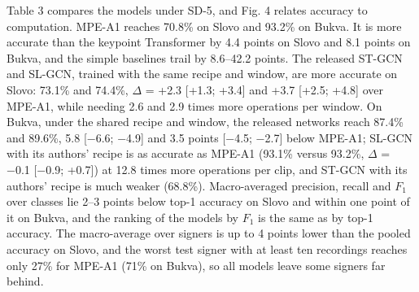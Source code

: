 Table 3 compares the models under SD-5, and Fig. 4 relates accuracy to computation. MPE-A1 reaches 70.8\% on Slovo and 93.2\% on Bukva. It is more accurate than the keypoint Transformer by 4.4 points on Slovo and 8.1 points on Bukva, and the simple baselines trail by 8.6--42.2 points. The released ST-GCN and SL-GCN, trained with the same recipe and window, are more accurate on Slovo: 73.1\% and 74.4\%, \(\Delta\) = +2.3 {[}+1.3; +3.4{]} and +3.7 {[}+2.5; +4.8{]} over MPE-A1, while needing 2.6 and 2.9 times more operations per window. On Bukva, under the shared recipe and window, the released networks reach 87.4\% and 89.6\%, 5.8 {[}−6.6; −4.9{]} and 3.5 points {[}−4.5; −2.7{]} below MPE-A1; SL-GCN with its authors' recipe is as accurate as MPE-A1 (93.1\% versus 93.2\%, \(\Delta\) = −0.1 {[}−0.9; +0.7{]}) at 12.8 times more operations per clip, and ST-GCN with its authors' recipe is much weaker (68.8\%). Macro-averaged precision, recall and \(F_1\) over classes lie 2--3 points below top-1 accuracy on Slovo and within one point of it on Bukva, and the ranking of the models by \(F_1\) is the same as by top-1 accuracy. The macro-average over signers is up to 4 points lower than the pooled accuracy on Slovo, and the worst test signer with at least ten recordings reaches only 27\% for MPE-A1 (71\% on Bukva), so all models leave some signers far behind.

